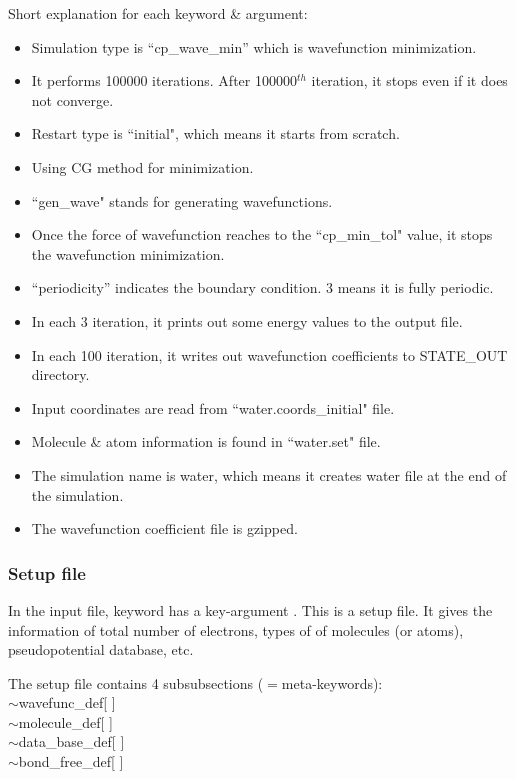 Short explanation for each keyword \& argument:
\begin{itemize}
\item Simulation type is ``cp\_wave\_min'' which is wavefunction minimization.
\item It performs 100000 iterations. After 100000$^{th}$ iteration, it stops even if it does not converge.
\item Restart type is ``initial", which means it starts from scratch.
\item Using CG method for minimization.
\item ``gen\_wave" stands for generating wavefunctions.
\item Once the force of wavefunction reaches to the ``cp\_min\_tol" value, it stops the wavefunction minimization.
\item ``periodicity'' indicates the boundary condition. 3 means it is fully periodic.
\item In each 3 iteration, it prints out some energy values to the output file.
\item In each 100 iteration, it writes out wavefunction coefficients to STATE\_OUT directory.
\item Input coordinates are read from ``water.coords\_initial" file.
\item Molecule \& atom information is found in ``water.set" file.
\item The simulation name is water, which means it creates water file at the end of the simulation.
\item The wavefunction coefficient file is gzipped.
\end{itemize}


\subsubsection{Setup file}
In the input file, keyword {\selectfont{\textbackslash mol\_set\_file} }has a key-argument {\selectfont{water.set}}. This is a setup file. It gives the information of total number of electrons, types of of molecules (or atoms), pseudopotential database, etc.

The setup file contains 4 subsubsections ($=$meta-keywords):\\
{\selectfont
$\sim$wavefunc\_def[ ]\\
$\sim$molecule\_def[ ]\\
$\sim$data\_base\_def[ ]\\
$\sim$bond\_free\_def[ ]\\
}

